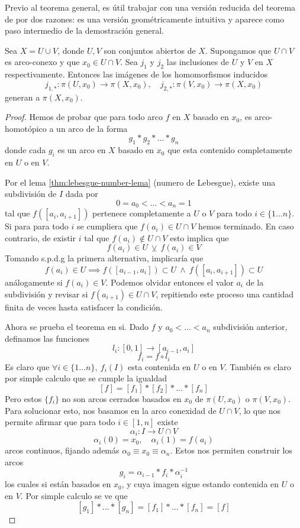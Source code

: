 Previo al teorema general, es útil trabajar con una versión reducida del
teorema de \vank por dos razones: es una versión geométricamente
intuitiva y aparece como paso intermedio de la demostración general.

\begin{teorema} \label{thm:vank-especifico}
  Sea \(X = U \cup V\), donde \(U,V\) son conjuntos abiertos de \(X\).
  Supongamos que \(U \cap V\) es arco-conexo y que \(x_0 \in U \cap V\).
  Sea \(j_1\) y \(j_2\) las inclusiones de \(U\) y \(V\) en \(X\)
  respectivamente. Entonces las imágenes de los homomorfismos inducidos
  \[ j_{1,*} : \pi (U, x_0) \to \pi (X, x_0), \quad j_{2,*} : \pi
  (V, x_0) \to \pi (X, x_0) \]
  generan a \(\pi (X,x_0)\).
\end{teorema}
\begin{proof}
  Hemos de probar que para todo arco \(f\) en \(X\) basado en \(x_0\),
  es arco-homotópico a un arco de la forma
  \[ g_1 * g_2 * ... * g_n \]
  donde cada \(g_i\) es un arco en \(X\) basado en \(x_0\) que esta
  contenido completamente en \(U\) o en \(V\).

  Por el lema \ref{thm:lebesgue-number-lema} (numero de Lebesgue),
  existe una subdivisión de \(I\) dada por
  \[ 0 = a_0 < ... < a_n = 1\]
  tal que
  \(f ([a_i , a_{i+1}])\) pertenece completamente a \(U\) o \(V\) para
  todo \(i \in \{1 \dotsc n\}\). Si para para todo \(i\) se cumpliera que
  \(f(a_i) \in U \cap V\) hemos terminado. En caso contrario, de existir
  \(i\) tal que \(f(a_i) \not \in U \cap V\) esto implica que
  \[ f(a_i) \in U \ \veebar \ f(a_i) \in V \]
  Tomando s.p.d.g la primera alternativa, implicaría que
  \[ f(a_i) \in U \implies f([a_{i-1}, a_{i}]) \subset U \ \land \ f([a_i,
    a_{i+1}]) \subset U \]
  análogamente si \(f(a_i) \in V\). Podemos olvidar entonces el valor
  \(a_i\) de la subdivisión y revisar si \(f(a_{i+1}) \in U \cap V\),
  repitiendo este proceso una cantidad finita de veces hasta satisfacer
  la condición.

  Ahora se prueba el teorema en si. Dado \(f\) y \(a_0 < ... < a_n\)
  subdivisión anterior, definamos las funciones
  \[ l_i : [0,1] \to [a_{i-1}, a_{i}] \]
  \[ f_i = f \circ l_i \]
  Es claro que \(\forall i \in \{1 \dotsc n\}, \ f_i (I) \) esta contenida en
  \(U\) o en \(V\). También es claro por simple calculo que se cumple
  la igualdad
  \[ [f] = [f_1] * [f_2] * ... * [f_n] \]
  Pero estos \(\{f_i\}\) no son arcos cerrados basados en \(x_0\) de
  \(\pi (U,x_0)\) o \(\pi (V,x_0)\). Para solucionar esto, nos basamos
  en la arco conexidad de \(U \cap V\), lo que nos permite afirmar que
  para todo \(i \in [1 , n]\) existe
  \[ \alpha_i : I \to U \cap V \]
  \[ \alpha_i (0) = x_0, \quad \alpha_i (1) = f(a_i) \]
  arcos continuos, fijando además \(\alpha_0 \equiv x_0 \equiv \alpha_n
  \). Estos nos permiten construir los arcos
  \[ g_i = \alpha_{i-1} * f_i * \alpha_i^{-1} \]
  los cuales si están basados en \(x_0\), y cuya imagen sigue estando
  contenida en \(U\) o en \(V\). Por simple calculo se ve que
  \[ [g_1] * ... * [g_n] = [f_1] * ... * [f_n] = [f] \]
\end{proof}
